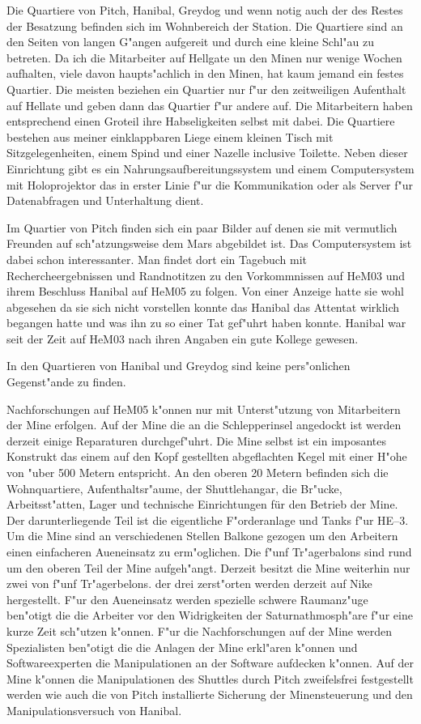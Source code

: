 Die Quartiere von Pitch, Hanibal, Greydog und wenn notig auch der des Restes der Besatzung befinden sich im Wohnbereich der Station. Die Quartiere sind an den Seiten von langen G"angen aufgereit und durch eine kleine Schl"au\3 zu betreten. Da ich die Mitarbeiter auf Hellgate un den Minen nur wenige Wochen aufhalten, viele davon haupts"achlich in den Minen, hat kaum jemand ein festes Quartier. Die meisten beziehen ein Quartier nur f"ur den zeitweiligen Aufenthalt auf Hellate und geben dann das Quartier f"ur andere auf. Die Mitarbeitern haben entsprechend einen Gro\3teil ihre Habseligkeiten selbst mit dabei. Die Quartiere bestehen aus meiner einklappbaren Liege einem kleinen Tisch mit Sitzgelegenheiten, einem Spind und einer Na\3zelle inclusive Toilette. Neben dieser Einrichtung gibt es ein Nahrungsaufbereitungssystem und einem Computersystem mit Holoprojektor das in erster Linie f"ur die Kommunikation oder als Server f"ur Datenabfragen und Unterhaltung dient.

Im Quartier von Pitch finden sich ein paar Bilder auf denen sie mit vermutlich Freunden auf sch"atzungsweise dem Mars abgebildet ist. Das Computersystem ist dabei schon interessanter. Man findet dort ein Tagebuch mit Rechercheergebnissen und Randnotitzen zu den Vorkommnissen auf HeM03 und ihrem Beschluss Hanibal auf HeM05 zu folgen. Von einer Anzeige hatte sie wohl abgesehen da sie sich nicht vorstellen konnte das Hanibal das Attentat wirklich begangen hatte und was ihn zu so einer Tat gef"uhrt haben konnte. Hanibal war seit der Zeit auf HeM03 nach ihren Angaben ein gute Kollege gewesen.

In den Quartieren von Hanibal und Greydog sind keine pers"onlichen Gegenst"ande zu finden.

Nachforschungen auf HeM05 k"onnen nur mit Unterst"utzung von Mitarbeitern der Mine erfolgen. Auf der Mine die an die Schlepperinsel angedockt ist werden derzeit einige Reparaturen durchgef"uhrt. Die Mine selbst ist ein imposantes Konstrukt das einem auf den Kopf gestellten abgeflachten Kegel mit einer H"ohe von "uber 500 Metern entspricht. An den oberen 20 Metern befinden sich die Wohnquartiere, Aufenthaltsr"aume, der Shuttlehangar, die Br"ucke, Arbeitsst"atten, Lager und technische Einrichtungen für den Betrieb der Mine. Der darunterliegende Teil ist die eigentliche F"orderanlage und Tanks f"ur HE--3. Um die Mine sind an verschiedenen Stellen Balkone gezogen um den Arbeitern einen einfacheren Au\3eneinsatz zu erm"oglichen. Die f"unf Tr"agerbalons sind rund um den oberen Teil der Mine aufgeh"angt. 
Derzeit besitzt die Mine weiterhin nur zwei von f"unf Tr"agerbelons. der drei zerst"orten werden derzeit auf Nike hergestellt. F"ur den Au\3eneinsatz werden spezielle schwere Raumanz"uge ben"otigt die die Arbeiter vor den Widrigkeiten der Saturnathmosph"are f"ur eine kurze Zeit sch"utzen k"onnen. F"ur die Nachforschungen auf der Mine werden Spezialisten ben"otigt die die Anlagen der Mine erkl"aren k"onnen und Softwareexperten die Manipulationen an der Software aufdecken k"onnen. Auf der Mine k"onnen die Manipulationen des Shuttles durch Pitch zweifelsfrei festgestellt werden wie auch die von Pitch installierte Sicherung der Minensteuerung und den Manipulationsversuch von Hanibal.

